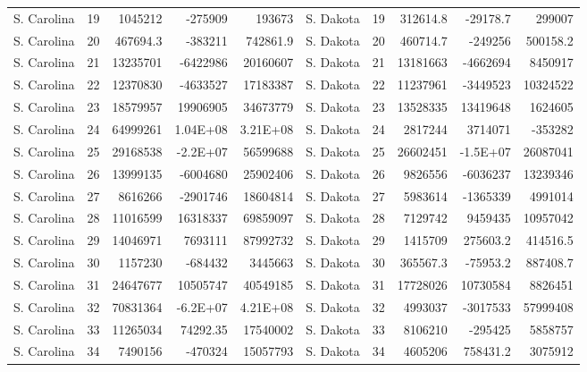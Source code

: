 \begin{landscape}
\begin{singlespace}
\begin{longtable}{lrrrr|lrrrr}
		S. Carolina &  19 & 1045212 & -275909 & 193673 & S. Dakota &  19 & 312614.8 & -29178.7 & 299007 \\
		S. Carolina &  20 & 467694.3 & -383211 & 742861.9 & S. Dakota &  20 & 460714.7 & -249256 & 500158.2 \\
		S. Carolina &  21 & 13235701 & -6422986 & 20160607 & S. Dakota &  21 & 13181663 & -4662694 & 8450917 \\
		S. Carolina &  22 & 12370830 & -4633527 & 17183387 & S. Dakota &  22 & 11237961 & -3449523 & 10324522 \\
		S. Carolina &  23 & 18579957 & 19906905 & 34673779 & S. Dakota &  23 & 13528335 & 13419648 & 1624605 \\
		S. Carolina &  24 & 64999261 & 1.04E+08 & 3.21E+08 & S. Dakota &  24 & 2817244 & 3714071 & -353282 \\
		S. Carolina &  25 & 29168538 & -2.2E+07 & 56599688 & S. Dakota &  25 & 26602451 & -1.5E+07 & 26087041 \\
		S. Carolina &  26 & 13999135 & -6004680 & 25902406 & S. Dakota &  26 & 9826556 & -6036237 & 13239346 \\
		S. Carolina &  27 & 8616266 & -2901746 & 18604814 & S. Dakota &  27 & 5983614 & -1365339 & 4991014 \\
		S. Carolina &  28 & 11016599 & 16318337 & 69859097 & S. Dakota &  28 & 7129742 & 9459435 & 10957042 \\
		S. Carolina &  29 & 14046971 & 7693111 & 87992732 & S. Dakota &  29 & 1415709 & 275603.2 & 414516.5 \\
		S. Carolina &  30 & 1157230 & -684432 & 3445663 & S. Dakota &  30 & 365567.3 & -75953.2 & 887408.7 \\
		S. Carolina &  31 & 24647677 & 10505747 & 40549185 & S. Dakota &  31 & 17728026 & 10730584 & 8826451 \\
		S. Carolina &  32 & 70831364 & -6.2E+07 & 4.21E+08 & S. Dakota &  32 & 4993037 & -3017533 & 57999408 \\
		S. Carolina &  33 & 11265034 & 74292.35 & 17540002 & S. Dakota &  33 & 8106210 & -295425 & 5858757 \\
		S. Carolina &  34 & 7490156 & -470324 & 15057793 & S. Dakota &  34 & 4605206 & 758431.2 & 3075912\\



\end{longtable}
\end{singlespace}
\end{landscape}
